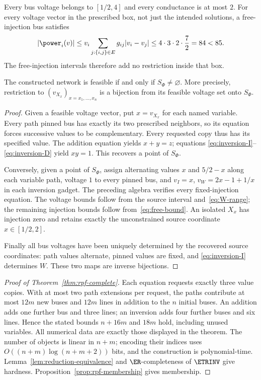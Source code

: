 Every bus voltage belongs to $[1/2,4]$ and every conductance is at most $2$.
For every voltage vector in the prescribed box, not just the intended
solutions, a free-injection bus satisfies
\begin{equation}
 |\power_i(v)|
 \le v_i\sum_{j:\{i,j\}\in E}g_{ij}|v_i-v_j|
 \le 4\cdot3\cdot2\cdot\frac72=84<85.
 \label{eq:free-bound}
\end{equation}
The free-injection intervals therefore add no restriction inside that box.

\begin{lemma}
\label{lem:reduction-equivalence}
The constructed network is feasible if and only if $S_\Phi\ne\varnothing$.
More precisely, restriction to $(v_{X_x})_{x= x_1,\ldots,x_n}$ is a bijection
from its feasible voltage set onto $S_\Phi$.
\end{lemma}
\begin{proof}
Given a feasible voltage vector, put $x=v_{X_x}$ for each named variable.
Every path pinned bus has exactly its two prescribed neighbors, so its
equation forces successive values to be complementary. Every requested copy
thus has its specified value. The addition equation yields $x+y=z$; equations
\eqref{eq:inversion-I}--\eqref{eq:inversion-D} yield $xy=1$. This recovers a
point of $S_\Phi$.

Conversely, given a point of $S_\Phi$, assign alternating values $x$ and
$5/2-x$ along each variable path, voltage $1$ to every pinned bus, and
$v_I=x$, $v_W=2x-1+1/x$ in each inversion gadget. The preceding algebra
verifies every fixed-injection equation. The voltage bounds follow from the
source interval and~\eqref{eq:W-range}; the remaining injection bounds follow
from~\eqref{eq:free-bound}. An isolated $X_x$ has injection zero and retains
exactly the unconstrained source coordinate $x\in[1/2,2]$.

Finally all bus voltages have been uniquely determined by the recovered
source coordinates: path values alternate, pinned values are fixed, and
\eqref{eq:inversion-I} determines $W$. These two maps are inverse bijections.
\end{proof}

\begin{proof}[Proof of Theorem~\ref{thm:rpf-complete}]
Each equation requests exactly three value copies. With at most two path
extensions per request, the paths contribute at most $12m$ new buses and
$12m$ lines in addition to the $n$ initial buses. An addition adds one
further bus and three lines; an inversion adds four further buses and six
lines. Hence the stated bounds $n+16m$ and $18m$ hold, including unused
variables. All numerical data are exactly those displayed in the theorem.
The number of objects is linear in $n+m$; encoding their indices uses
$O((n+m)\log(n+m+2))$ bits, and the construction is polynomial-time.
Lemma~\ref{lem:reduction-equivalence} and $\ER$-completeness of $\ETRINV$
give hardness. Proposition~\ref{prop:rpf-membership} gives membership.
\end{proof}

